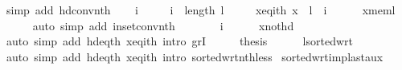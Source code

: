 \begin{isabellebody}
\ {\isacharparenleft}{\kern0pt}simp\ add{\isacharcolon}{\kern0pt}\ hd{\isacharunderscore}{\kern0pt}conv{\isacharunderscore}{\kern0pt}nth{\isacharparenright}{\kern0pt}\isanewline
\ \ \isamarkupfalse%
\ i\ \isanewline
\ \ \ \ {\isachardoublequoteopen}i\ {\isacharless}{\kern0pt}\ length\ l{\isachardoublequoteclose}\ \isanewline
\ \ \ \ x{\isacharunderscore}{\kern0pt}eq{\isacharunderscore}{\kern0pt}ith{\isacharcolon}{\kern0pt}\ {\isachardoublequoteopen}x\ {\isacharequal}{\kern0pt}\ l\ {\isacharbang}{\kern0pt}\ i{\isachardoublequoteclose}\isanewline
\ \ \ \ \isamarkupfalse%
\ x{\isacharunderscore}{\kern0pt}mem{\isacharunderscore}{\kern0pt}l\isanewline
\ \ \ \ \isamarkupfalse%
\ {\isacharparenleft}{\kern0pt}auto\ simp\ add{\isacharcolon}{\kern0pt}\ in{\isacharunderscore}{\kern0pt}set{\isacharunderscore}{\kern0pt}conv{\isacharunderscore}{\kern0pt}nth{\isacharparenright}{\kern0pt}\isanewline
\ \ \isamarkupfalse%
\ \isamarkupfalse%
\ {\isachardoublequoteopen}{}\ {\isacharless}{\kern0pt}\ i{\isachardoublequoteclose}\isanewline
\ \ \ \ \isamarkupfalse%
\ x{\isacharunderscore}{\kern0pt}not{\isacharunderscore}{\kern0pt}hd\isanewline
\ \ \ \ \isamarkupfalse%
\ {\isacharparenleft}{\kern0pt}auto\ simp\ add{\isacharcolon}{\kern0pt}\ hd{\isacharunderscore}{\kern0pt}eq{\isacharunderscore}{\kern0pt}{}th\ x{\isacharunderscore}{\kern0pt}eq{\isacharunderscore}{\kern0pt}ith\ intro{\isacharcolon}{\kern0pt}\ gr{}I{\isacharparenright}{\kern0pt}\isanewline
\ \ \isamarkupfalse%
\ \isamarkupfalse%
\ {\isacharquery}{\kern0pt}thesis\isanewline
\ \ \ \ \isamarkupfalse%
\ l{\isacharunderscore}{\kern0pt}sorted{\isacharunderscore}{\kern0pt}wrt\isanewline
\ \ \ \ \isamarkupfalse%
\ {\isacharparenleft}{\kern0pt}auto\ simp\ add{\isacharcolon}{\kern0pt}\ hd{\isacharunderscore}{\kern0pt}eq{\isacharunderscore}{\kern0pt}{}th\ x{\isacharunderscore}{\kern0pt}eq{\isacharunderscore}{\kern0pt}ith\ intro{\isacharcolon}{\kern0pt}\ sorted{\isacharunderscore}{\kern0pt}wrt{\isacharunderscore}{\kern0pt}nth{\isacharunderscore}{\kern0pt}less{\isacharparenright}{\kern0pt}\isanewline
{}\isamarkupfalse%
%
\endisatagproof
{\isafoldproof}%
%
\isadelimproof
\isanewline
%
\endisadelimproof
%
\isadeliminvisible
\isanewline
%
\endisadeliminvisible
%
\isataginvisible
{}\isamarkupfalse%
\ sorted{\isacharunderscore}{\kern0pt}wrt{\isacharunderscore}{\kern0pt}imp{\isacharunderscore}{\kern0pt}last{\isacharunderscore}{\kern0pt}aux{\isacharcolon}{\kern0pt}\isanewline

\end{isabellebody}
